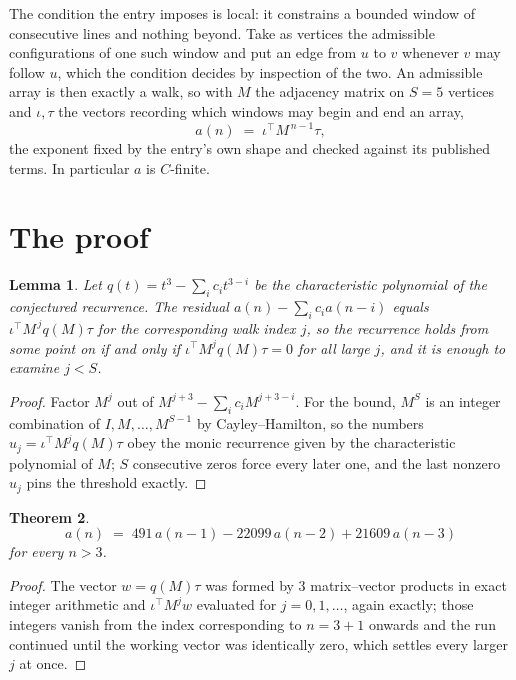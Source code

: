 \documentclass[11pt,a4paper]{article}
\theoremstyle{plain}
\newtheorem{theorem}{Theorem}
\newtheorem{lemma}[theorem]{Lemma}
\theoremstyle{definition}
\begin{document}
The condition the entry imposes is local: it constrains a bounded window of consecutive lines and nothing beyond. Take as
vertices the admissible configurations of one such window and put an edge from $u$ to $v$
whenever $v$ may follow $u$, which the condition decides by inspection of the two. An
admissible array is then exactly a walk, so with $M$ the adjacency matrix on $S=5$ vertices
and $\iota,\tau$ the vectors recording which windows may begin and end an array,
\[
a(n)\;=\;\iota^{\!\top}M^{\,n-1}\tau ,
\]
the exponent fixed by the entry's own shape and checked against its published terms. In
particular $a$ is $C$-finite.

\section{The proof}

\begin{lemma}\label{lem:crit}
Let $q(t)=t^{3}-\sum_i c_it^{3-i}$ be the characteristic polynomial of the
conjectured recurrence. The residual $a(n)-\sum_ic_ia(n-i)$ equals
$\iota^{\!\top}M^{\,j}q(M)\tau$ for the corresponding walk index $j$, so the recurrence
holds from some point on if and only if $\iota^{\!\top}M^{j}q(M)\tau=0$ for all large $j$,
and it is enough to examine $j<S$.
\end{lemma}

\begin{proof}
Factor $M^{j}$ out of $M^{j+3}-\sum_ic_iM^{j+3-i}$. For the bound, $M^{S}$
is an integer combination of $I,M,\dots,M^{S-1}$ by Cayley--Hamilton, so the numbers
$u_j=\iota^{\!\top}M^{j}q(M)\tau$ obey the monic recurrence given by the characteristic
polynomial of $M$; $S$ consecutive zeros force every later one, and the last nonzero $u_j$
pins the threshold exactly.
\end{proof}

\begin{theorem}
\[
a(n)\;=\;491\,a(n-1) - 22099\,a(n-2) + 21609\,a(n-3)
\]
for every $n>3$.
\end{theorem}

\begin{proof}
The vector $w=q(M)\tau$ was formed by $3$ matrix--vector products in exact integer
arithmetic and $\iota^{\!\top}M^{j}w$ evaluated for $j=0,1,\dots$, again exactly; those
integers vanish from the index corresponding to $n=3+1$ onwards and the run continued
until the working vector was identically zero, which settles every larger $j$ at once.
\end{proof}
\end{document}
